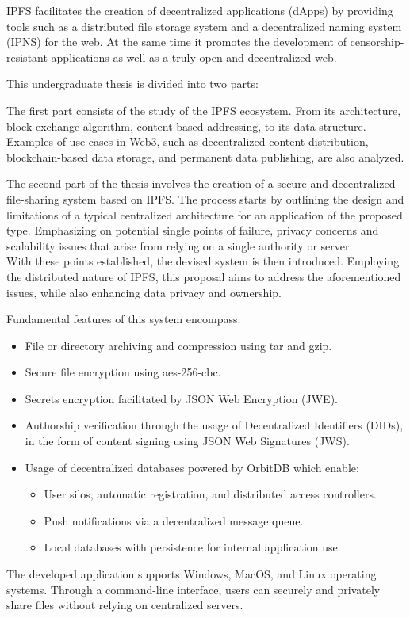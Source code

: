 IPFS facilitates the creation of decentralized applications (dApps) by providing tools such as a distributed file storage system and a decentralized naming system (IPNS) for the web. At the same time it promotes the development of censorship-resistant applications as well as a truly open and decentralized web.

This undergraduate thesis is divided into two parts:

The first part consists of the study of the IPFS ecosystem. From its architecture, block exchange algorithm, content-based addressing, to its data structure. Examples of use cases in Web3, such as decentralized content distribution, blockchain-based data storage, and permanent data publishing, are also analyzed.

The second part of the thesis involves the creation of a secure and decentralized file-sharing system based on IPFS.
The process starts by outlining the design and limitations of a typical centralized architecture for an application of the proposed type. Emphasizing on potential single points of failure, privacy concerns and scalability issues that arise from relying on a single authority or server.
\\With these points established, the devised system is then introduced. Employing the distributed nature of IPFS, this proposal aims to address the aforementioned issues, while also enhancing data privacy and ownership.

Fundamental features of this system encompass:

\begin{itemize}[itemsep=1pt,nolistsep]
    \item File or directory archiving and compression using tar and gzip.
    \item Secure file encryption using aes-256-cbc.
    \item Secrets encryption facilitated by JSON Web Encryption (JWE).
    \item Authorship verification through the usage of Decentralized Identifiers (DIDs), in the form of content signing using JSON Web Signatures (JWS).
    \item Usage of decentralized databases powered by OrbitDB which enable:
          \begin{itemize}
              \item User silos, automatic registration, and distributed access controllers.
              \item Push notifications via a decentralized message queue.
              \item Local databases with persistence for internal application use.
          \end{itemize}
\end{itemize}


The developed application supports Windows, MacOS, and Linux operating systems. Through a command-line interface, users can securely and privately share files without relying on centralized servers.